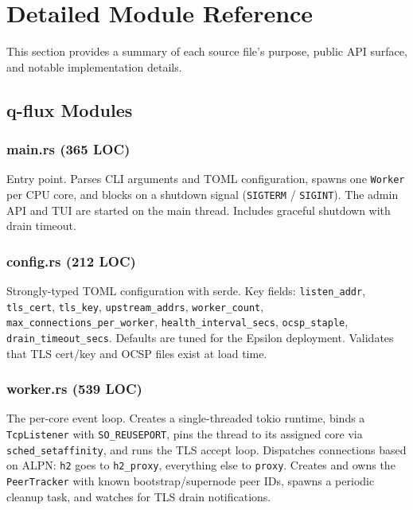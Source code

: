 \documentclass[a4paper, 11pt]{article}
\begin{document}
\section{Detailed Module Reference}

This section provides a summary of each source file's purpose,
public API surface, and notable implementation details.

\subsection{q-flux Modules}

\subsubsection{main.rs (365 LOC)}

Entry point.  Parses CLI arguments and TOML configuration, spawns one
\texttt{Worker} per CPU core, and blocks on a shutdown signal
(\texttt{SIGTERM} / \texttt{SIGINT}).  The admin API and TUI are
started on the main thread.  Includes graceful shutdown with drain
timeout.

\subsubsection{config.rs (212 LOC)}

Strongly-typed TOML configuration with serde.  Key fields:
\texttt{listen\_addr}, \texttt{tls\_cert}, \texttt{tls\_key},
\texttt{upstream\_addrs}, \texttt{worker\_count},
\texttt{max\_connections\_per\_worker}, \texttt{health\_interval\_secs},
\texttt{ocsp\_staple}, \texttt{drain\_timeout\_secs}.
Defaults are tuned for the Epsilon deployment.  Validates that TLS
cert/key and OCSP files exist at load time.

\subsubsection{worker.rs (539 LOC)}

The per-core event loop.  Creates a single-threaded tokio runtime,
binds a \texttt{TcpListener} with \texttt{SO\_REUSEPORT}, pins the
thread to its assigned core via \texttt{sched\_setaffinity}, and runs
the TLS accept loop.  Dispatches connections based on ALPN:
\texttt{h2} goes to \texttt{h2\_proxy}, everything else to
\texttt{proxy}.  Creates and owns the \texttt{PeerTracker} with
known bootstrap/supernode peer IDs, spawns a periodic cleanup task,
and watches for TLS drain notifications.
\end{document}
